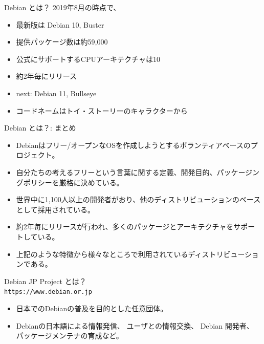 \documentclass[cjk,c,squeeze,shrink,dvipdfmx,12pt]{beamer}
\begin{document}
\begin{frame}[fragile]{Debian とは？}
  2019年8月の時点で、
  \pause
  \begin{itemize}[<+->]
  \item
    最新版は {\alert{Debian 10}}, Buster
  \item
    提供パッケージ数は{\alert{約59,000}}
  \item
    公式にサポートするCPUアーキテクチャは{\alert{10}}
  \item {\alert{約2年毎}}にリリース
  \item next: Debian 11, Bullseye
  \item コードネームはトイ・ストーリーのキャラクターから
  \end{itemize}
\end{frame}

\begin{frame}[fragile]{Debian とは？: まとめ}
  \pause
  \begin{itemize}[<+->]
  \item Debianはフリー/オープンなOSを作成しようとするボランティアベースのプロジェクト。
  \item 自分たちの考えるフリーという言葉に関する定義、開発目的、パッケージングポリシーを厳格に決めている。
  \item 世界中に1,100人以上の開発者がおり、他のディストリビューションのベースとして採用されている。
  \item 約2年毎にリリースが行われ、多くのパッケージとアーキテクチャをサポートしている。
  \item 上記のような特徴から様々なところで利用されているディストリビューションである。
\end{itemize}
\end{frame}

\begin{frame}[fragile]{Debian JP Project とは？\\[-.5em]{\normalsize{\texttt{https://www.debian.or.jp}}}}
  \pause
  \begin{itemize}[<+->]
  \item 日本でのDebianの普及を目的とした任意団体。
  \item %
    Debianの日本語による情報発信、
    ユーザとの情報交換、
    Debian 開発者、
    パッケージメンテナの育成など。
  \end{itemize}
\end{frame}
\end{document}
